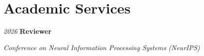 \section{Academic Services}

\begin{twocolentry}{\textit{2026}}
    \textbf{Reviewer}
    \par\textit{Conference on Neural Information Processing Systems (NeurIPS)}
\end{twocolentry}
